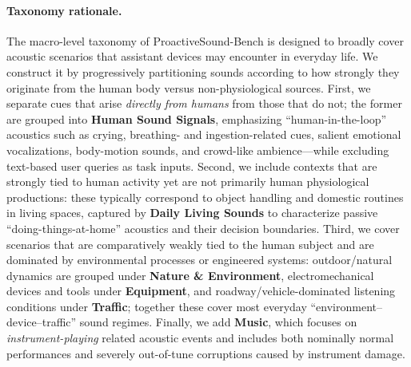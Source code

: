 \documentclass{llmxive}
\begin{document}
\paragraph{Taxonomy rationale.}
The macro-level taxonomy of ProactiveSound-Bench is designed to broadly cover acoustic scenarios that assistant devices may encounter in everyday life.
We construct it by progressively partitioning sounds according to how strongly they originate from the human body versus non-physiological sources.
First, we separate cues that arise \emph{directly from humans} from those that do not; the former are grouped into \textbf{Human Sound Signals}, emphasizing ``human-in-the-loop'' acoustics such as crying, breathing- and ingestion-related cues, salient emotional vocalizations, body-motion sounds, and crowd-like ambience---while excluding text-based user queries as task inputs.
Second, we include contexts that are strongly tied to human activity yet are not primarily human physiological productions: these typically correspond to object handling and domestic routines in living spaces, captured by \textbf{Daily Living Sounds} to characterize passive ``doing-things-at-home'' acoustics and their decision boundaries.
Third, we cover scenarios that are comparatively weakly tied to the human subject and are dominated by environmental processes or engineered systems: outdoor/natural dynamics are grouped under \textbf{Nature \& Environment}, electromechanical devices and tools under \textbf{Equipment}, and roadway/vehicle-dominated listening conditions under \textbf{Traffic}; together these cover most everyday ``environment--device--traffic'' sound regimes.
Finally, we add \textbf{Music}, which focuses on \emph{instrument-playing} related acoustic events and includes both nominally normal performances and severely out-of-tune corruptions caused by instrument damage.
\end{document}

